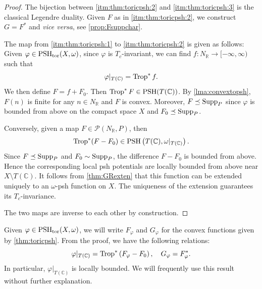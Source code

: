 \begin{proof}
The bijection between \ref{itm:thm:toricpsh:2} and \ref{itm:thm:toricpsh:3} is the classical Legendre duality. Given $F$ as in \ref{itm:thm:toricpsh:2}, we construct $G=F^*$ and \emph{vice versa}, see \cref{prop:Fsuppchar}.

The map from \ref{itm:thm:toricpsh:1} to \ref{itm:thm:toricpsh:2} is given as follows: Given $\varphi\in \mathrm{PSH}_{\mathrm{tor}}(X,\omega)$, since $\varphi$ is $T_c$-invariant, we can find $f\colon N_{\mathbb{R}}\rightarrow [-\infty,\infty)$ such that
\begin{equation}\label{ex:varphitropf}
\varphi|_{T(\mathbb{C})}=\operatorname{Trop}^*f.
\end{equation}
We then define $F=f+F_0$. Then $\operatorname{Trop}^* F\in \mathrm{PSH}(T(\mathbb{C}))$.
By \cref{lma:convextopsh}, $F(n)$ is finite for any $n\in N_{\mathbb{R}}$ and $F$ is convex. Moreover, $F\preceq \operatorname{Supp}_P$ since $\varphi$ is bounded from above on the compact space $X$ and $F_0\preceq \operatorname{Supp}_P$.

Conversely, given a map $F\in \mathcal{P}(N_{\mathbb{R}},P)$, then
\[
\operatorname{Trop}^*(F-F_0)\in \mathrm{PSH}\left(T(\mathbb{C}),\omega|_{T(\mathbb{C})}\right).
\]
Since $F\preceq \operatorname{Supp}_P$ and $F_0\sim \operatorname{Supp}_P$, the difference $F-F_0$ is bounded from above. Hence the corresponding local psh potentials are locally bounded from above near $X\setminus T(\mathbb{C})$. It follows from \cref{thm:GRexten} that this function can be extended uniquely to an $\omega$-psh function on $X$. The uniqueness of the extension guarantees its $T_c$-invariance.

The two maps are inverse to each other by construction.
\end{proof}


Given $\varphi\in \mathrm{PSH}_{\mathrm{tor}}(X,\omega)$, we will write $F_{\varphi}$ and $G_{\varphi}$ for the convex functions given by \cref{thm:toricpsh}. From the proof, we have the following relations:
\begin{equation}\label{eq:FvarphidefGdef}
\varphi|_{T(\mathbb{C})}=\operatorname{Trop}^*\left(F_{\varphi}-F_0\right),\quad G_{\varphi}=F_{\varphi}^*.
\end{equation}
In particular, $\varphi|_{T(\mathbb{C})}$ is locally bounded. We will frequently use this result without further explanation.

